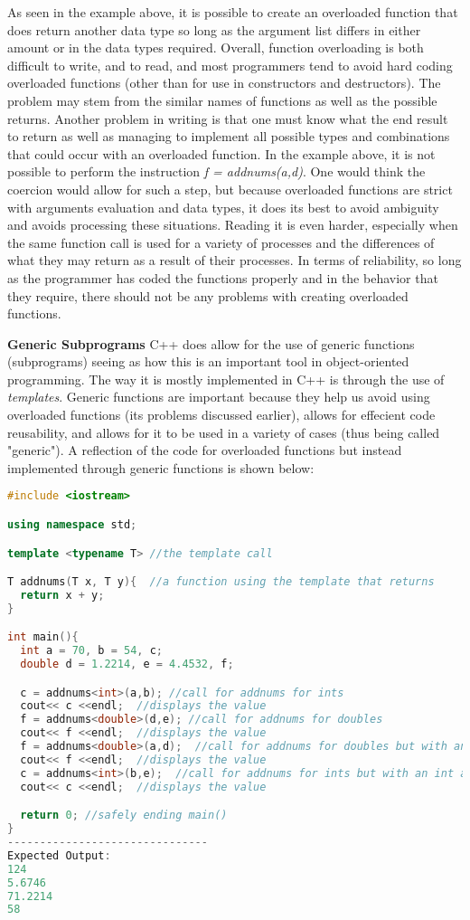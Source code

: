 \documentclass[12pt]{article}
\begin{document}
As seen in the example above, it is possible to create an overloaded function that does return another data type so long as the argument list differs in either amount or in the data types required. Overall, function overloading is both difficult to write, and to read, and most programmers tend to avoid hard coding overloaded functions (other than for use in constructors and destructors). The problem may stem from the similar names of functions as well as the possible returns. Another problem in writing is that one must know what the end result to return as well as managing to implement all possible types and combinations that could occur with an overloaded function. In the example above, it is not possible to perform the instruction \textit{f = addnums(a,d)}. One would think the coercion would allow for such a step, but because overloaded functions are strict with arguments evaluation and data types, it does its best to avoid ambiguity and avoids processing these situations. Reading it is even harder, especially when the same function call is used for a variety of processes and the differences of what they may return as a result of their processes. In terms of reliability, so long as the programmer has coded the functions properly and in the behavior that they require, there should not be any problems with creating overloaded functions.

\textbf{Generic Subprograms} C++ does allow for the use of generic functions (subprograms) seeing as how this is an important tool in object-oriented programming. The way it is mostly implemented in C++ is through the use of \textit{templates}. Generic functions are important because they help us avoid using overloaded functions (its problems discussed earlier), allows for effecient code reusability, and allows for it to be used in a variety of cases (thus being called "generic"). A reflection of the code for overloaded functions but instead implemented through generic functions is shown below:
\begin{lstlisting}[language=C++]
#include <iostream>

using namespace std;

template <typename T> //the template call

T addnums(T x, T y){  //a function using the template that returns 
  return x + y;
}

int main(){
  int a = 70, b = 54, c;
  double d = 1.2214, e = 4.4532, f;

  c = addnums<int>(a,b); //call for addnums for ints
  cout<< c <<endl;  //displays the value
  f = addnums<double>(d,e); //call for addnums for doubles
  cout<< f <<endl;  //displays the value
  f = addnums<double>(a,d);  //call for addnums for doubles but with an int and a double
  cout<< f <<endl;  //displays the value
  c = addnums<int>(b,e);  //call for addnums for ints but with an int and a double
  cout<< c <<endl;  //displays the value

  return 0; //safely ending main()
}
-------------------------------
Expected Output:
124
5.6746
71.2214
58
\end{lstlisting}
\end{document}
